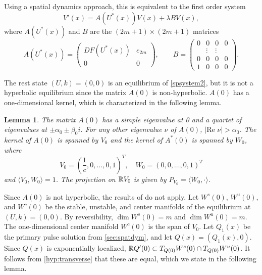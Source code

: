 \documentclass[10pt,reqno]{amsart}
\theoremstyle{plain}
\newtheorem{lemma}[theorem]{Lemma}
\theoremstyle{definition}
\theoremstyle{remark}
\numberwithin{theorem}{section}
\numberwithin{equation}{section}
\begin{document}
Using a spatial dynamics approach, this is equivalent to the first order system 
\begin{equation}\label{PDEeigsystem}
V'(x) = A(U^*(x))V(x) + \lambda B V(x),
\end{equation}
where $A(U^*(x))$ and $B$ are the $(2m+1) \times (2m+1)$ matrices
\begin{equation}\label{defAB}
A(U^*(x)) = 
\begin{pmatrix}
DF(U^*(x)) & e_{2m}\\
0 & 0
\end{pmatrix}, \qquad
B = \begin{pmatrix}0 & 0 & 0 & 0 \\ & 
\vdots & \vdots & \\0 & 0 & 0 & 0 \\ 1 & 0 & 0 & 0 \end{pmatrix}.
\end{equation}

The rest state $(U, k) = (0, 0)$ is an equilibrium of \cref{spsystem2}, but it is not a hyperbolic equilibrium since the matrix $A(0)$ is non-hyperbolic. $A(0)$ has a one-dimensional kernel, which is characterized in the following lemma. 

\begin{lemma}\label{eigA0lemma}
The matrix $A(0)$ has a simple eigenvalue at 0 and a quartet of eigenvalues at $\pm \alpha_0 \pm \beta_0 i$. For any other eigenvalue $\nu$ of $A(0)$, $|\text{Re }\nu| > \alpha_0$. The kernel of $A(0)$ is spanned by $V_0$ and the kernel of $A^*(0)$ is spanned by $W_0$, where
\begin{equation}\label{V0W0}
V_0 = \left(\frac{1}{c}, 0, \dots, 0, 1\right)^T, \quad
W_0 = (0, 0, \dots, 0, 1)^T
\end{equation}
and $\langle V_0, W_0 \rangle = 1$. The projection on $\mathbb{R} V_0$ is given by $P_{V_0} = \langle W_0, \cdot \rangle$.
\end{lemma}

Since $A(0)$ is not hyperbolic, the results of \cite{Sandstede1998} do not apply. Let $W^s(0)$, $W^u(0)$, and $W^c(0)$ be the stable, unstable, and center manifolds of the equilibrium at $(U, k) = (0, 0)$. By reversibility, $\dim W^s(0) = m$ and $\dim W^u(0) = m$. The one-dimensional center manifold $W^c(0)$ is the span of $V_0$. Let $Q_1(x)$ be the primary pulse solution from \cref{sec:spatdym}, and let $Q(x) = (Q_1(x), 0)$. Since $Q(x)$ is exponentially localized, $\mathbb{R} Q'(0) \subset T_{Q(0)}W^s(0) \cap T_{Q(0)}W^u(0)$. It follows from \cref{hyp:transverse} that these are equal, which we state in the following lemma.
\end{document}
